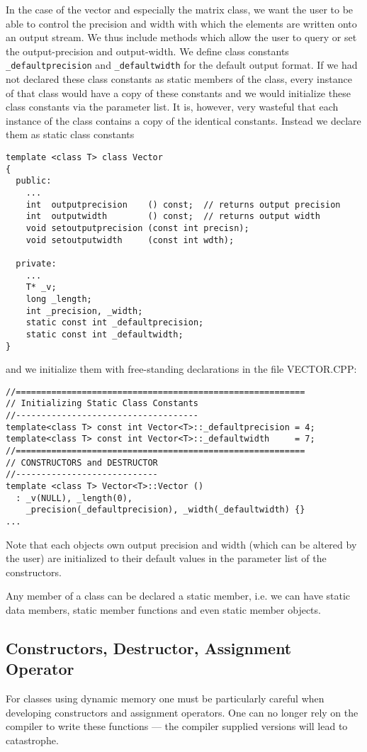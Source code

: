 In the case of the vector and especially the matrix class, we want the user to
be able to control the precision and width with which the elements are written
onto an output stream. We thus include methods which allow the user to query 
or set the output-precision and output-width. We define class constants 
\verb+_defaultprecision+ and \verb+_defaultwidth+ for the default output format.
If we had not declared these class constants as static members of the class, every
instance of that class would have a copy of these constants and we would initialize
these class constants via the parameter list. It is, however, very wasteful that each
instance of the class contains a copy of the identical constants. Instead we declare 
them as static class constants
{\footnotesize \begin{verbatim}
template <class T> class Vector
{
  public:
    ...
    int  outputprecision    () const;  // returns output precision
    int  outputwidth        () const;  // returns output width
    void setoutputprecision (const int precisn);
    void setoutputwidth     (const int wdth);

  private:
    ...
    T* _v;
    long _length;
    int _precision, _width;
    static const int _defaultprecision;
    static const int _defaultwidth;
}
\end{verbatim}}
and we initialize them with free-standing declarations in the file
VECTOR.CPP:
{\footnotesize \begin{verbatim}
//=========================================================
// Initializing Static Class Constants
//------------------------------------
template<class T> const int Vector<T>::_defaultprecision = 4;
template<class T> const int Vector<T>::_defaultwidth     = 7;
//=========================================================
// CONSTRUCTORS and DESTRUCTOR
//----------------------------
template <class T> Vector<T>::Vector ()
  : _v(NULL), _length(0),
    _precision(_defaultprecision), _width(_defaultwidth) {}
...
\end{verbatim}}
Note that each objects own output precision and width (which can be
altered by the user) are initialized to their default values in the
parameter list of the constructors.
 
Any member of a class can be declared a static member, i.e. we can have
static data members, static member functions and even static member objects.


\subsection{Constructors, Destructor, Assignment Operator}
For classes using dynamic memory one must be particularly careful 
when developing constructors and assignment operators. One can no
longer rely on the compiler to write these functions --- the
compiler supplied versions will lead to catastrophe.

